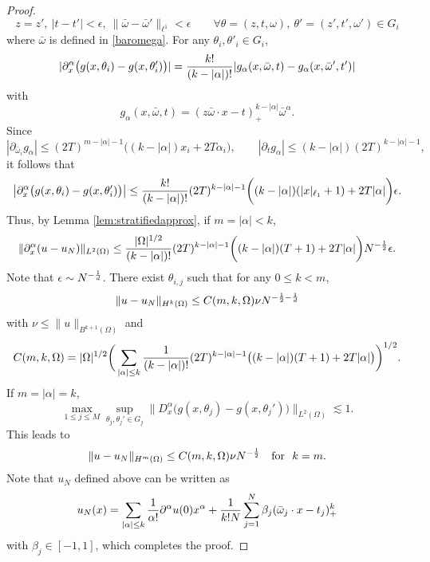 \begin{proof}
\begin{equation}
z=z',\ |t-t'|<\epsilon,\ \|\bar \omega  - \bar \omega'\|_{\ell^1}<\epsilon\qquad \forall \theta=(z, t, \omega),\ \theta'=(z', t', \omega')\in G_i
\end{equation}
where $\bar\omega$ is defined in \eqref{baromega}. 
For any $\theta_i, \theta'_i\in G_i$,  
$$
| \partial_x^\alpha \big (g(x,\theta_i) - g(x,\theta_i')\big )| = {k!\over (k-|\alpha|)!} | g_\alpha(x, \bar\omega, t) -  g_\alpha(x, \bar\omega', t')| 
$$
with 
\begin{equation}
 g_\alpha(x, \bar\omega, t)  = (z\bar \omega\cdot x-t)^{k-|\alpha|}_+\bar \omega^\alpha.
 \end{equation} 
 Since
$$
|\partial_{\bar\omega_i}  g_\alpha|\le (2T)^{m-|\alpha|-1}\big ((k-|\alpha|)x_i + 2T\alpha_i\big ), \qquad |\partial_t  g_\alpha|\le (k-|\alpha|)(2T)^{k-|\alpha|-1},
$$
it follows that
\begin{equation}
\big | \partial_x^\alpha \big (g(x,\theta_i) - g(x,\theta_i')\big )\big | \le {k!\over (k-|\alpha|)!}(2T)^{k-|\alpha|-1}   \bigg ( (k-|\alpha|)(|x|_{\ell_1}+1) + 2T|\alpha |\bigg ) \epsilon.
\end{equation}
Thus, by Lemma \ref{lem:stratifiedapprox}, if $m=|\alpha|<k$,
\begin{equation}
\|  \partial_x^\alpha (u - u_N)\|_{L^2(\Omega)} \le {|\Omega|^{1/2}\over (k-|\alpha|)!}(2T)^{k-|\alpha|-1}   \bigg ( (k-|\alpha|)(T+1) + 2T|\alpha |\bigg )N^{-{1\over 2}}\epsilon.
\end{equation}
Note that $\epsilon \sim N^{-{1\over d}}$. There exist $\theta_{i,j}$ such that for any $0\le k< m$,
\begin{equation}
\| u - u_N\|_{H^k(\Omega)} \le  C(m,k,\Omega)\nu N^{-{1\over 2}-{1\over d}}
\end{equation}
with $\nu\le \|u\|_{B^{k+1}(\Omega)}$ and
\begin{equation}\label{equ:defcmko}
C(m,k,\Omega)=|\Omega|^{1/2}\bigg (\sum_{|\alpha|\le k}{1\over (k-|\alpha|)!}(2T)^{k-|\alpha|-1}   \big ( (k-|\alpha|)(T+1) + 2T|\alpha |\big )\bigg )^{1/2}.
\end{equation} 
If $m=|\alpha|=k$,
$$
\max_{1\le j\le M}\sup_{\theta_{j},\theta_{j}'\in G_j} \| D_x^\alpha \big(g(x,\theta_j) - g(x,\theta_j')\big)\|_{L^2(\Omega)}\lesssim 1.
$$
This leads to 
\begin{equation}
\| u - u_N\|_{H^m(\Omega)} \le  C(m,k,\Omega)\nu N^{-{1\over 2}}\quad \mbox{for }\ k=m.
\end{equation}
Note that $u_N$ defined above can be written as
$$
u_N(x)=  \sum_{|\alpha|\le k}{1\over \alpha!} \partial^\alpha u(0) x^\alpha + {1\over k!N}\sum_{j=1}^{N}\beta_j (\bar \omega_j\cdot x - t_j)_+^k
$$ 
with $\beta_j\in [-1, 1]$,
which completes the proof.
\end{proof}

